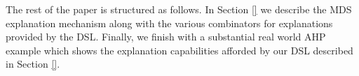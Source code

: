\documentclass{jfp}
\newcommand{\prog}[1]{\texttt{#1}}
\begin{document}



The rest of the paper is structured as follows. In Section \ref{} we describe the MDS explanation mechanism along with the various combinators for explanations provided by the DSL. Finally, we finish with a substantial real world AHP example which shows the explanation capabilities afforded by our DSL described in Section \ref{}. 





\end{document}
